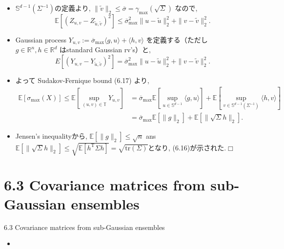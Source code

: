 \documentclass[unicode,aspectratio=169,11pt]{beamer}
\def\qed{\hfill $\Box$}
\newcommand{\ex}{\mathbb{E}}
\newcommand{\bb}{\mathbb}
\newcommand{\tr}{\mathrm{T}}
\newcommand{\trace}{\mathrm{tr}}
\begin{document}
\begin{frame}
  \begin{itemize}
    \item $\bb{S}^{d-1}(\Sigma^{-1})$の定義より, $\|\tilde{v}\|_2 \le \overline{\sigma} = \gamma_{\max}(\sqrt{\Sigma})$ なので,
            \[ \ex[(Z_{u,v} - Z_{\tilde{u}, \tilde{v}})^2] \le \overline{\sigma}^2_{\max} \|u-\tilde{u}\|_2^2 + \|v-\tilde{v}\|_2^2.\]
    \item Gaussian process $Y_{u,v} := \overline{\sigma}_{\max}\langle g, u\rangle + \langle h, v\rangle$ を定義する（ただし $g\in\bb{R}^n, h \in \bb{R}^d$ はstandard Gaussian rv's）と,
            \[ E[(Y_{u,v} - Y_{\tilde{u},\tilde{v}})^2] = \overline{\sigma}^2_{\max}\|u-\tilde{u}\|_2^2 + \|v - \tilde{v}\|_2^2. \]
    \item よって Sudakov-Fernique bound (6.17) より,
    \begin{align*}
      \ex[\sigma_{\max}(X)] \le \ex\left[ \sup_{(u,v) \in \bb{T}} Y_{u,v}\right]
      &= \overline{\sigma}_{\max}\ex\left[\sup_{u \in\bb{S}^{d-1}}\langle g, u \rangle\right] + \ex\left[ \sup_{v \in \bb{S}^{d-1}(\Sigma^{-1})}\langle h, v\rangle \right]\\
      &= \overline{\sigma}_{\max}\ex[\|g\|_2] + \ex[\|\sqrt{\Sigma}h\|_2].
    \end{align*}
    \item Jensen's inequalityから, $\ex[\|g\|_2] \le \sqrt{n}$ ans $\ex[\|\sqrt{\Sigma}h\|_2] \le \sqrt{\ex[h^\tr \Sigma h]} = \sqrt{\trace(\Sigma)}$となり, (6.16)が示された.\qed
  \end{itemize}
\end{frame}

\section{6.3 Covariance matrices from sub-Gaussian ensembles}
\begin{frame}{6.3 Covariance matrices from sub-Gaussian ensembles}{}
  \begin{itemize}
    \item 
  \end{itemize}
\end{frame}
\end{document}
